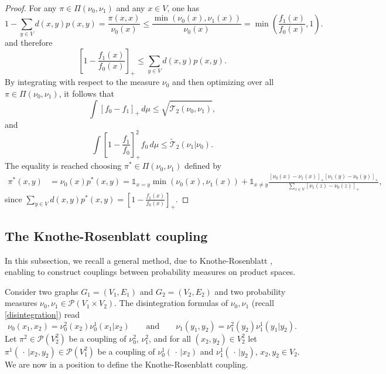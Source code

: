 \documentclass[11pt]{amsart}
\numberwithin{equation}{section}
\begin{document}
\begin{proof} For any $\pi \in \Pi(\nu_{0},\nu_{1})$ and any $x\in V$, one has 
$$1- \sum_{y \in V} d(x,y)p(x,y)=\frac{\pi(x,x)}{\nu_0(x)}\leq \frac{\min(\nu_0(x),\nu_1(x))}{\nu_0(x)}=\min\left(\frac{f_1(x)}{f_0(x)},1\right).$$
and therefore 
$$\left[1-\frac{f_1(x)}{f_0(x)} \right]_+\leq \sum_{y \in V} d(x,y)p(x,y).$$
By integrating  with respect to the measure $\nu_0$ and then optimizing over all $\pi \in \Pi(\nu_{0},\nu_{1})$, it follows that 
$$\int \left[f_0-f_1 \right]_+ \,d\mu\leq\sqrt{\hat {\mathcal{T}}_{2}(\nu_0 ,\nu_1 )},$$
and 
$$
 \int \left[1-\frac{f_1}{f_0} \right]_+^2 f_0\,d\mu\leq 
{\widetilde{\mathcal{T}}}_2(\nu_1 |\nu_0 ).$$
The equality is reached choosing $\pi^* \in \Pi(\nu_{0},\nu_{1})$ defined by
\begin{align}\label{couplagebis}
\pi^*(x,y) 
& =
\nu_0(x)p^*(x,y) 
= 
{\mathds{1}}_{x= y}\min(\nu_0(x),\nu_1(x))+{\mathds{1}}_{x\neq y}\frac{[\nu_0(x)-\nu_1(x)]_+[\nu_1(y)-\nu_0(y)]_+}{ \sum_{z \in V} [\nu_1(z)-\nu_0(z)]_+},
\end{align}
since 
$\sum_{y \in V} d(x,y)p^*(x,y)=\left[1-\frac{f_1(x)}{f_0(x)} \right]_+.$
\end{proof}

\subsection{The Knothe-Rosenblatt coupling}\label{sec:knothe}

In this subsection, we recall a general method, due to Kno\-the-Rosenblatt \cite{knothe,rosenblatt}, enabling to construct couplings between probability measures on product spaces.

Consider two graphs $G_1=(V_1,E_1)$ and $G_2=(V_2,E_2)$ and two probability measures 
$\nu_0,\nu_1 \in  \mathcal{P}(V_1 \times V_2)$. The disintegration formulas of $\nu_0, \nu_1$  (recall \eqref{disintegration}) read
\begin{equation} \label{disintegration2}
\nu_0(x_1,x_2)=\nu_0^2(x_2)\nu_0^1(x_1|x_2) \qquad \mbox{and}
\qquad \nu_1(y_1,y_2)=\nu_1^2(y_2)\nu_1^1(y_1|y_2) .
\end{equation}
Let $\pi^2 \in  \mathcal{P}( V_2^2)$ be a coupling 
of  $\nu_0^2$, $\nu_1^2$, and  for all $(x_{2},y_{2}) \in V_{2}^2$ let $\pi^1(\,\cdot\,|x_2,y_2) \in  \mathcal{P}(V_1^2)$ be a coupling of 
$\nu_0^1(\,\cdot\, | x_2)$ and $\nu_1^1(\,\cdot\, | y_2)$, $x_2, y_2 \in V_2$. We are now in a position to define the Knothe-Rosenblatt coupling.
\end{document}
